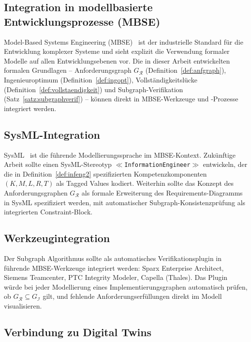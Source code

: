 ﻿\documentclass[a4paper,12pt]{report}
\theoremstyle{definition}
\begin{document}
\subsection{Integration in modellbasierte Entwicklungsprozesse (MBSE)}

Model-Based Systems Engineering (MBSE)~\cite{friedenthal2011} ist der industrielle
Standard für die Entwicklung komplexer Systeme und sieht explizit die Verwendung
formaler Modelle auf allen Entwicklungsebenen vor. Die in dieser Arbeit entwickelten
formalen Grundlagen -- Anforderungsgraph $G_\mathcal{R}$ (Definition~\ref{def:anfgraph}),
Ingenieuroptimum (Definition~\ref{def:ingopt}), Vollständigkeitslücke
(Definition~\ref{def:vollstaendigkeit}) und Subgraph-Verifikation
(Satz~\ref{satz:subgraphverif}) -- können direkt in MBSE-Werkzeuge und -Prozesse
integriert werden.

\subsection{SysML-Integration}

SysML~\cite{sysml2019} ist die führende Modellierungssprache im MBSE-Kontext.
Zukünftige Arbeit sollte einen SysML-Stereotyp \texttt{$\ll$InformationEngineer$\gg$}
entwickeln, der die in Definition~\ref{def:infeng2} spezifizierten Kompetenzkomponenten
$(K, M, L, R, T)$ als Tagged Values kodiert. Weiterhin sollte das Konzept des
Anforderungsgraphen $G_\mathcal{R}$ als formale Erweiterung des Requirements-Diagramms
in SysML spezifiziert werden, mit automatischer Subgraph-Konsistenzprüfung als
integrierten Constraint-Block.

\subsection{Werkzeugintegration}

Der Subgraph Algorithmus sollte als automatisches Verifikationsplugin in führende
MBSE-Werkzeuge integriert werden: Sparx Enterprise Architect, Siemens Teamcenter,
PTC Integrity Modeler, Capella (Thales). Das Plugin würde bei jeder Modellierung
eines Implementierungsgraphen automatisch prüfen, ob $G_\mathcal{R} \subseteq G_\mathcal{I}$
gilt, und fehlende Anforderungserfüllungen direkt im Modell visualisieren.

\subsection{Verbindung zu Digital Twins}
\end{document}
